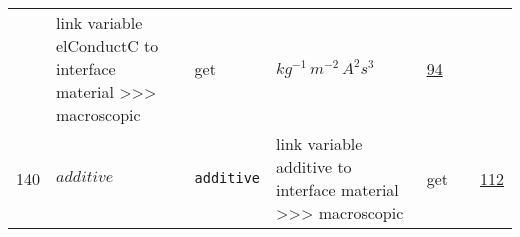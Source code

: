 \begin{longtable}{|p{1cm}|p{2.5cm}|p{4.5cm}|p{8cm}|p{3.0cm}|p{3cm}|p{1cm}|}
             & link variable elConductC to interface material >>> macroscopic
             & \begin{lay}get \end{lay}
             & $ kg^{-1} \,m^{-2} \,A^{2} s^{3} \, $
             & \hyperlink{"e:94"}{ 94 }
                 \\
    140
             & \hypertarget{"v:140"}{ $ {additive}{_{}} $}
             & \verb|additive|
             & link variable additive to interface material >>> macroscopic
             & \begin{lay}get \end{lay}
             & $  $
             & \hyperlink{"e:112"}{ 112 }
                 \\
    \end{longtable}